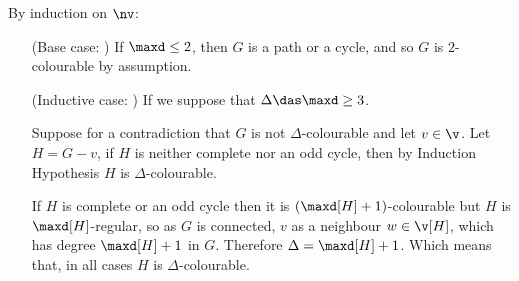 \begin{prf}
    By induction on $\nv$:
    \begin{itemize}
        \item[(Base case: )] If $\maxd \leq 2$, then $G$ is a path or a cycle, and so $G$ is $2$-colourable by assumption.
        \item[(Inductive case: )] If we suppose that $\Delta \das \maxd \geq 3$.
        
        Suppose for a contradiction that $G$ is not $\Delta$-colourable and let $v \in \v$. Let $H = G - v$, if $H$ is neither complete nor an odd cycle, then by Induction Hypothesis $H$ is $\Delta$-colourable.

        If $H$ is complete or an odd cycle then it is $(\maxd[H] + 1)$-colourable but $H$ is $\maxd[H]$-regular, so as $G$ is connected, $v$ as a neighbour $w \in \v[H]$, which has degree $\maxd[H] + 1$ in $G$. Therefore $\Delta = \maxd[H] + 1$. Which means that, in all cases $H$ is $\Delta$-colourable.


\end{itemize}
\end{prf}

